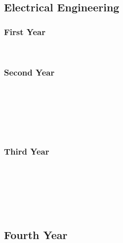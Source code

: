 \subsection{Electrical Engineering}

\subsubsection{First Year}
\begin{center}
\begin{multicols}{2}
 \\
\end{multicols}
\end{center}

\subsubsection{Second Year}
\begin{center}
\begin{multicols}{2}
 \\
 \\
 \\
 \\
 \\
\end{multicols}
\end{center}

\subsubsection{Third Year}
\begin{center}
\begin{multicols}{2}
 \\
 \\
 \\
 \\
 \\
\end{multicols}
\end{center}

\subsection{Fourth Year}
 \\

